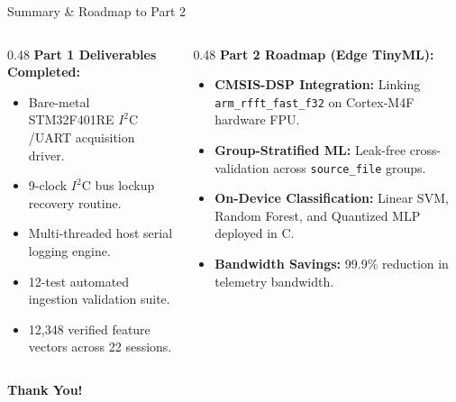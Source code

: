\documentclass[aspectratio=169, 10pt]{beamer}
\begin{document}
\begin{frame}{Summary \& Roadmap to Part 2}
    \begin{columns}[T]
        \begin{column}{0.48\textwidth}
            \textbf{Part 1 Deliverables Completed:}
            \begin{itemize}
                \item Bare-metal STM32F401RE $I^2\text{C}$/UART acquisition driver.
                \item 9-clock $I^2\text{C}$ bus lockup recovery routine.
                \item Multi-threaded host serial logging engine.
                \item 12-test automated ingestion validation suite.
                \item 12,348 verified feature vectors across 22 sessions.
            \end{itemize}
        \end{column}
        \begin{column}{0.48\textwidth}
            \textbf{Part 2 Roadmap (Edge TinyML):}
            \begin{itemize}
                \item \textbf{CMSIS-DSP Integration:} Linking \texttt{arm\_rfft\_fast\_f32} on Cortex-M4F hardware FPU.
                \item \textbf{Group-Stratified ML:} Leak-free cross-validation across \texttt{source\_file} groups.
                \item \textbf{On-Device Classification:} Linear SVM, Random Forest, and Quantized MLP deployed in C.
                \item \textbf{Bandwidth Savings:} 99.9\% reduction in telemetry bandwidth.
            \end{itemize}
        \end{column}
    \end{columns}
    \vspace{0.4cm}
    \begin{center}
        \textbf{\large Thank You!} \\[0.2cm]
    \end{center}
\end{frame}
\end{document}
